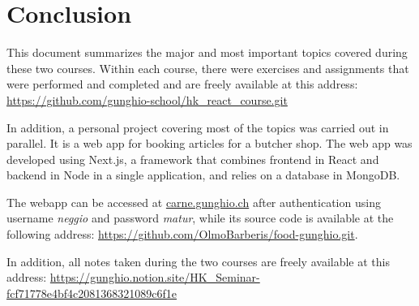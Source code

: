 \chapter*{Conclusion}
This document summarizes the major and most important topics covered during these two courses. Within each course, there were exercises and assignments that were performed and completed and are freely available at this address: \url{https://github.com/gunghio-school/hk_react_course.git}

In addition, a personal project covering most of the topics was carried out in parallel.
It is a web app for booking articles for a butcher shop. The web app was developed using Next.js, a framework that combines frontend in React and backend in Node in a single application, and relies on a database in MongoDB.

The webapp can be accessed at \url{carne.gunghio.ch} after authentication using username \textit{neggio} and password \textit{matur}, while its source code is available at the following address: \url{https://github.com/OlmoBarberis/food-gunghio.git}.

In addition, all notes taken during the two courses are freely available at this address: \url{https://gunghio.notion.site/HK_Seminar-fcf71778e4bf4c2081368321089c6f1e}